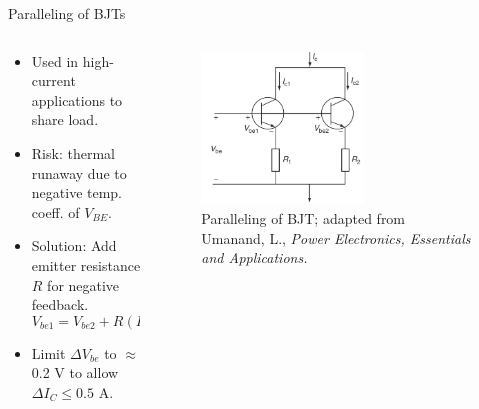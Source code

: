 \begin{frame}{Paralleling of BJTs}
        \begin{columns}
        \begin{column}{0.5\textwidth}
\begin{itemize}
  \item Used in high-current applications to share load.
  \item Risk: thermal runaway due to negative temp. coeff. of $V_{BE}$.
  \item Solution: Add emitter resistance $R$ for negative feedback.
  \[
  V_{be1} = V_{be2} + R(I_{c1} - I_{c2}) \Rightarrow \Delta V_{be} = R \Delta I_c
  \]
  \item Limit $\Delta V_{be}$ to $\approx$ 0.2 V to allow $\Delta I_C \leq 0.5$ A.
\end{itemize}
        \end{column}

\begin{column}{0.5\textwidth}
\begin{figure}
\centering
\includegraphics[width=0.6\textwidth]{fig/lec04/BJT_parallel.png}
\caption{Paralleling of BJT; adapted from Umanand, L., \textit{Power Electronics, Essentials and Applications.}}
\label{fig:bjt_on_state_losses}
\end{figure}
    \end{column}
    \end{columns}
\end{frame}


